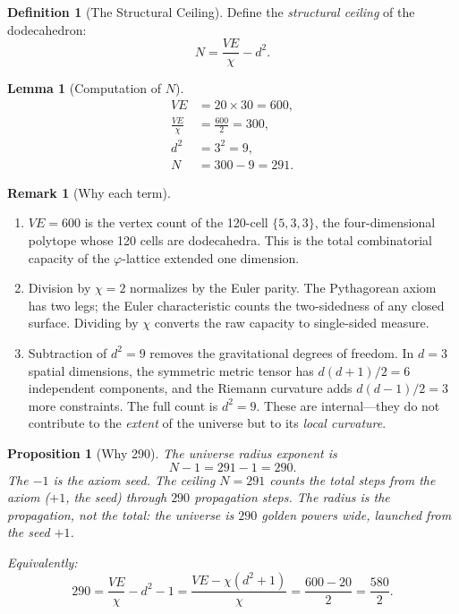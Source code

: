 \documentclass[11pt,a4paper]{article}
\theoremstyle{plain}
\newtheorem{lemma}[theorem]{Lemma}
\newtheorem{proposition}[theorem]{Proposition}
\theoremstyle{definition}
\newtheorem{definition}[theorem]{Definition}
\newtheorem{remark}[theorem]{Remark}
\newcommand{\vp}{\varphi}
\begin{document}
\begin{definition}[The Structural Ceiling]\label{def:ceiling}
Define the \emph{structural ceiling} of the dodecahedron:
\[
  N = \frac{VE}{\chi} - d^2.
\]
\end{definition}

\begin{lemma}[Computation of $N$]\label{lem:291}
\begin{align*}
  VE &= 20 \times 30 = 600, \\
  \frac{VE}{\chi} &= \frac{600}{2} = 300, \\
  d^2 &= 3^2 = 9, \\
  N &= 300 - 9 = 291.
\end{align*}
\end{lemma}

\begin{remark}[Why each term]\label{rem:terms}
\begin{enumerate}[nosep]
  \item $VE = 600$ is the vertex count of the 120-cell $\{5,3,3\}$,
    the four-dimensional polytope whose 120 cells are dodecahedra.
    This is the total combinatorial capacity of the $\vp$-lattice
    extended one dimension.
  \item Division by $\chi = 2$ normalizes by the Euler parity.
    The Pythagorean axiom has two legs; the Euler characteristic
    counts the two-sidedness of any closed surface.  Dividing by
    $\chi$ converts the raw capacity to single-sided measure.
  \item Subtraction of $d^2 = 9$ removes the gravitational degrees
    of freedom.  In $d = 3$ spatial dimensions, the symmetric metric
    tensor has $d(d+1)/2 = 6$ independent components, and the
    Riemann curvature adds $d(d-1)/2 = 3$ more constraints.
    The full count is $d^2 = 9$.  These are internal---they do not
    contribute to the \emph{extent} of the universe but to its
    \emph{local curvature}.
\end{enumerate}
\end{remark}

\begin{proposition}[Why 290]\label{prop:290}
The universe radius exponent is
\[
  N - 1 = 291 - 1 = 290.
\]
The $-1$ is the axiom seed.  The ceiling $N = 291$ counts the total
steps from the axiom ($+1$, the seed) through $290$ propagation steps.
The radius is the propagation, not the total: the universe is $290$
golden powers wide, launched from the seed $+1$.

Equivalently:
\[
  290 = \frac{VE}{\chi} - d^2 - 1 = \frac{VE - \chi(d^2 + 1)}{\chi}
  = \frac{600 - 20}{2} = \frac{580}{2}.
\]
\end{proposition}
\end{document}
